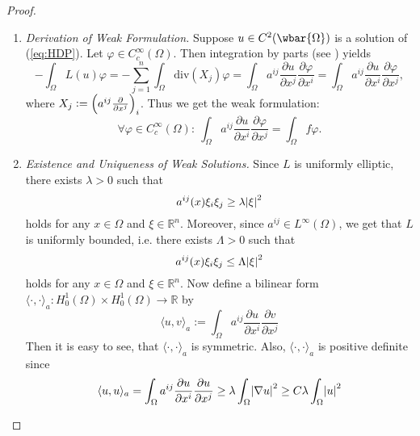 \begin{proof}
	~
	\begin{enumerate}[label = \textit{Step \arabic*:},wide=0pt]
		\item \textit{Derivation of Weak Formulation.} Suppose $u \in C^2(\wbar{\Omega})$ is a solution of (\ref{eq:HDP}). Let $\varphi \in C^\infty_c(\Omega)$. Then integration by parts (see \cite[436]{lee:smooth_manifolds:2013}) yields
			\begin{equation*}
				-\int_\Omega L(u) \varphi = - \sum_{j = 1}^n \int_\Omega \mathrm{div}(X_j)\varphi = \int_\Omega a^{ij} \frac{\partial u}{\partial x^j}\frac{\partial \varphi}{\partial x^i} = \int_\Omega a^{ij} \frac{\partial u}{\partial x^i}\frac{\partial \varphi}{\partial x^j},
			\end{equation*}
			\noindent where $X_j := \del[2]{a^{ij}\frac{\partial}{\partial x^j}}_i$. Thus we get the weak formulation:
			\begin{equation}
				\label{eq:HDPweak}
				\forall \varphi \in C^\infty_c(\Omega):\>\int_\Omega a^{ij} \frac{\partial u}{\partial x^i}\frac{\partial \varphi}{\partial x^j} = \int_\Omega f \varphi.
			\end{equation}
		\item \textit{Existence and Uniqueness of Weak Solutions.} Since $L$ is uniformly elliptic, there exists $\lambda > 0$ such that 
			\begin{equation*}
				a^{ij}(x) \xi_i \xi_j \geq \lambda \abs{\xi}^2
			\end{equation*}
			\noindent holds for any $x \in \Omega$ and $\xi \in \mathbb{R}^n$. Moreover, since $a^{ij} \in L^\infty(\Omega)$, we get that $L$ is uniformly bounded, i.e. there exists $\Lambda > 0$ such that
			\begin{equation*}
				a^{ij}(x) \xi_i \xi_j \leq \Lambda \abs{\xi}^2
			\end{equation*}
			\noindent holds for any $x \in \Omega$ and $\xi \in \mathbb{R}^n$. Now define a bilinear form $\langle \cdot,\cdot \rangle_a : H^1_0(\Omega) \times H^1_0(\Omega) \to \mathbb{R}$ by
			\begin{equation}
				\label{eq:inner_prod}
				\langle u,v \rangle_a := \int_\Omega a^{ij} \frac{\partial u}{\partial x^i}\frac{\partial v}{\partial x^j}
			\end{equation}
			Then it is easy to see, that $\langle \cdot,\cdot\rangle_a$ is symmetric. Also, $\langle \cdot,\cdot \rangle_a$ is positive definite since
			\begin{equation*}
				\langle u,u\rangle_a = \int_\Omega a^{ij} \frac{\partial u}{\partial x^i}\frac{\partial u}{\partial x^j} \geq \lambda \int_\Omega\abs{\nabla u}^2 \geq C \lambda \int_\Omega \abs{u}^2

\end{equation*}
\end{enumerate}
\end{proof}
